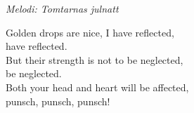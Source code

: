 {\footnotesize\textit{Melodi: Tomtarnas julnatt}}\par
\vspace{10pt}
Golden drops are nice, I have reflected,\\
have reflected.\\
But their strength is not to be neglected,\\
be neglected.\\
Both your head and heart will be affected,\\
punsch, punsch, punsch!
